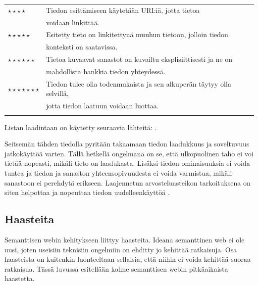 \documentclass[finnish, 12pt, a4paper, elec, utf8, pdfa, online]{aaltothesis}
\begin{document}
{\begin{tabular}{ll}
$\star\star\star\star$      & Tiedon esittämiseen käytetään URI:iä, jotta tietoa \\
\vspace*{0.2cm}             & voidaan linkittää. \\
$\star\star\star\star\star$ & Esitetty tieto on linkitettynä muuhun tietoon, jolloin tiedon \\        \vspace*{0.5cm}             & konteksti on saatavissa. \\
$\star\star\star\star\star\star$     & Tietoa kuvaavat sanastot on kuvailtu eksplisiittisesti ja ne on\\   \vspace*{0.2cm}               & mahdollista hankkia tiedon yhteydessä. \\
$\star\star\star\star\star\star\star$   & Tiedon tulee olla todenmukaista ja sen alkuperän täytyy olla selvillä, \\                & jotta tiedon laatuun voidaan luottaa. \\ \vspace*{0.05cm}
\end{tabular}
Listan laadintaan on käytetty seuraavia lähteitä: \cite{SeCo_stars} \cite{SeCo_stars2} \cite{Tim-BL}.

Seitsemän tähden tiedolla pyritään takaamaan tiedon laadukkuus ja soveltuvuus jatkokäyttöä varten. Tällä hetkellä ongelmana on se, että ulkopuolinen taho ei voi tietää nopeasti, mikäli tieto on laadukasta. Lisäksi tiedon ominaisuuksia ei voida tuntea ja tiedon ja sanaston yhteensopivuudesta ei voida varmistua, mikäli sanastoon ei perehdytä erikseen. Laajennetun arvosteluasteikon tarkoituksena on siten helpottaa ja nopeuttaa tiedon uudelleenkäyttöä \cite{SeCo_stars}.

\subsection{Haasteita}
Semanttisen webin kehitykseen liittyy haasteita. Ideana semanttinen web ei ole uusi, joten useisiin teknisiin ongelmiin on ehditty jo kehittää ratkaisuja. Osa haasteista on kuitenkin luonteeltaan sellaisia, että niihin ei voida kehittää suoraa ratkaisua. Tässä luvussa esitellään kolme semanttisen webin pitkäaikaista haastetta.
\enlargethispage{1\baselineskip}


}
\end{document}
